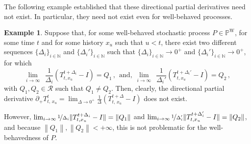 \documentclass[10pt,a4paper]{paper}
\theoremstyle{definition}
\newtheorem{exmp}{Example}%
\newcommand{\nats}{\mathbb{N}}
\newcommand{\processes}{\mathbb{P}}
\newcommand{\wprocesses}{\processes^{\mathrm{W}}}
\newcommand{\norm}[1]{\left\lVert #1 \right\rVert}
\begin{document}
The following example established that these directional partial derivatives need not exist. In particular, they need not exist even for well-behaved processes.
\begin{exmp}\label{exmp:well-behaved-no-deriv}
Suppose that, for some well-behaved stochastic process $P\in\wprocesses$, for some time $t$ and for some history $x_u$ such that $u<t$, there exist two different sequences $\{\Delta_i\}_{i\in\nats}$ and $\{\Delta_i'\}_{i\in\nats}$ such that $\{\Delta_i\}_{i\in\nats}\to0^+$ and $\{\Delta_i'\}_{i\in\nats}\to0^+$, for which
\begin{equation*}
\lim_{i\to\infty}~~\frac{1}{\Delta_i}\left(T_{t,x_u}^{t+\Delta_i} - I\right) = Q_1\,,~~\text{and,}~~ \lim_{i\to\infty}~~ \frac{1}{\Delta_i'}\left(T_{t,x_u}^{t+\Delta_i'} - I\right) = Q_2\,,
\end{equation*}
with $Q_1,Q_2\in\mathcal{R}$ such that $Q_1\neq Q_2$. Then, clearly, the directional partial derivative $\partial_{+}{T_{t,\,x_u}^t}=\lim_{\Delta\to 0^{+}}
\frac{1}{\Delta}
(T^{t+\Delta}_{t,\,x_u}-I)$ does not exist. 

However, $\lim_{i\to\infty}\nicefrac{1}{\Delta_i}\lVert T_{t,x_u}^{t+\Delta_i} - I\rVert = \norm{Q_1}$ and $\lim_{i\to\infty}\nicefrac{1}{\Delta_i'}\lVert T_{t,x_u}^{t+\Delta_i'} - I\rVert = \norm{Q_2}$, and because $\norm{Q_1},\norm{Q_2}<+\infty$, this is not problematic for the well-behavedness of $P$.


\end{exmp}
\end{document}
